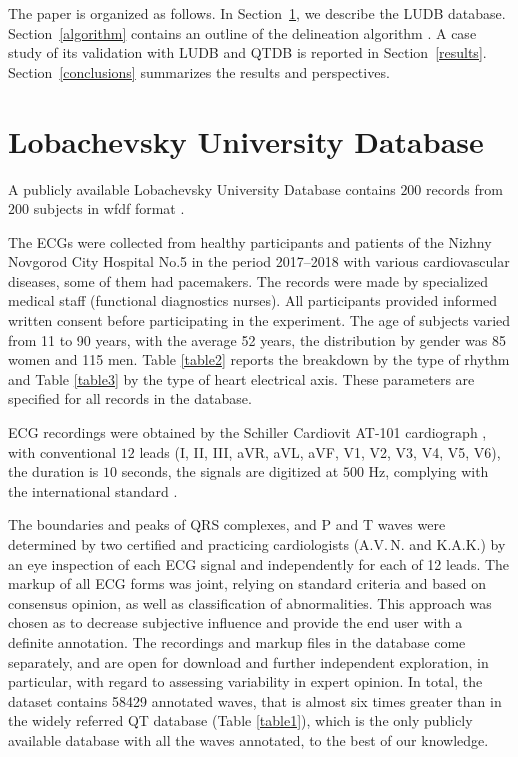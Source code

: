 \documentclass[submitted]{ieeeaccess}
\newcommand{\NewCorrection}[1]{{#1}}
\begin{document}
The paper is organized as follows.
In Section~\ref{database}, we describe the LUDB database.
Section~\ref{algorithm} contains an outline of the delineation algorithm \cite{Kalyakulina2018}. A case study of its validation with LUDB and QTDB is reported in Section~\ref{results}.
Section~\ref{conclusions} summarizes the results and perspectives.


\section{Lobachevsky University Database}\label{database}

A publicly available Lobachevsky University Database \cite{Our_PhysioNet} contains $200$ records from $200$ subjects in wfdf format \cite{PhysioNet}. 

The ECGs were collected from healthy participants and patients of the Nizhny Novgorod City Hospital No.5 in the period 2017--2018 with various cardiovascular diseases, some of them had pacemakers. The records were made by specialized medical staff (functional diagnostics nurses).
All participants provided informed written consent before participating in the experiment. The age of subjects varied from 11 to 90 years, with the average 52 years, the distribution by gender was 85 women and 115 men. Table \ref{table2} reports the breakdown by the type of rhythm and Table \ref{table3} by the type of heart electrical axis. These parameters are specified for all records in the database.

ECG recordings were obtained by the Schiller Cardiovit AT-101 cardiograph \cite{schiller}, with conventional $12$ leads (I, II, III, aVR, aVL, aVF, V1, V2, V3, V4, V5, V6), the duration is $10$ seconds, the signals are digitized at $500$ Hz, complying with the international \NewCorrection{standard} \cite{IEC}. 

The boundaries and peaks of QRS \NewCorrection{complexes}, and P and T waves were determined by two certified and practicing cardiologists (A.V.\,N. and K.A.K.) by an eye inspection of each ECG signal and independently for each of 12 leads. 
The markup of all ECG forms was joint, relying on standard criteria \cite{book} and based on consensus opinion, as well as classification of abnormalities. This approach was chosen as to decrease subjective influence and provide the end user with a definite annotation. The recordings and markup files in the database come separately, and are open for download and further independent exploration, in particular, with regard to assessing variability in expert opinion. In total, the dataset contains 58429 annotated waves, that is almost six times greater than in the widely referred QT database (Table \ref{table1}), which is the only publicly available database with all the waves annotated, to the best of our knowledge.
\end{document}
